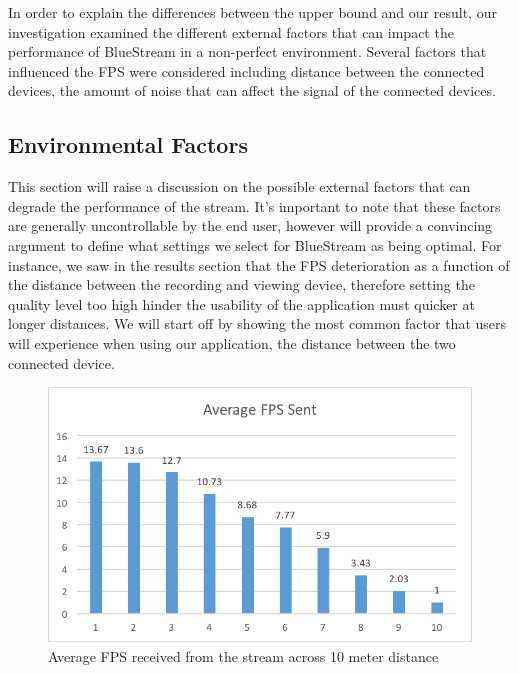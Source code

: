 \documentclass[a4paper,12pt]{article}
\begin{document}
In order to explain the differences between the upper bound and our result, our investigation examined the different external factors that can impact the performance of BlueStream in a non-perfect environment. Several factors that influenced the FPS were considered including distance between the connected devices, the amount of noise that can affect the signal of the connected devices. 

\subsection{Environmental Factors}
This section will raise a discussion on the possible external factors that can degrade the performance of the stream. It's important to note that these factors are generally uncontrollable by the end user, however will provide a convincing argument to define what settings we select for BlueStream as being optimal. For instance, we saw in the results section that the FPS deterioration as a function of the distance between the recording and viewing device, therefore setting the quality level too high hinder the usability of the application must quicker at longer distances. We will start off by showing the most common factor that users will experience when using our application, the distance between the two connected device.

\begin{figure}[h!]
\centering
\includegraphics[scale=1]{Figures/Figure14.png}
\caption{Average FPS received from the stream across 10 meter distance}
\label{fig:AvgFPSdistance}
\end{figure}
\end{document}
